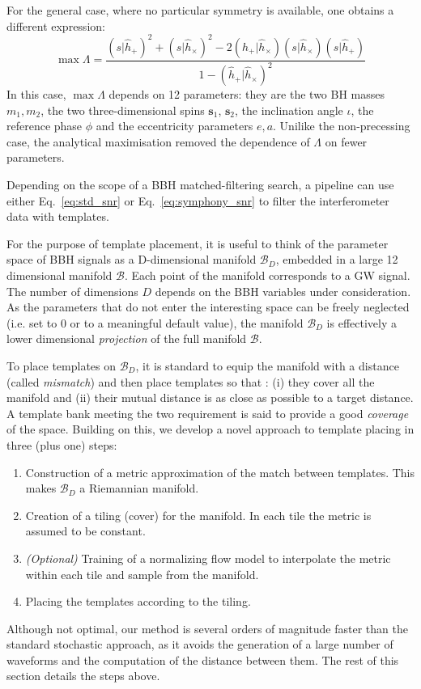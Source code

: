 \documentclass[twocolumn,showpacs,preprintnumbers,nofootinbib,prd,
superscriptaddress,10pt]{revtex4-2}
\newcommand{\rescalar}[2]{( #1 |#2 )}
\begin{document}
For the general case, where no particular symmetry is available, one obtains a different expression:
\begin{equation}\label{eq:symphony_snr}
	\max \Lambda = \frac{ \rescalar{s}{\hat{h}_+}^2 + \rescalar{s}{\hat{h}_\times}^2 -2\rescalar{\hat{h}_+}{\hat{h}_\times}\rescalar{s}{\hat{h}_\times}\rescalar{s}{\hat{h}_+}}{1- \rescalar{\hat{h}_+}{\hat{h}_\times}^2}
\end{equation}
In this case, $\max\Lambda$ depends on 12 parameters: they are the two BH masses $m_1, m_2$, the two three-dimensional spins $\mathbf{s}_1$, $\mathbf{s}_2$, the inclination angle $\iota$, the reference phase $\phi$ and the eccentricity parameters $e, a$.
Unilike the non-precessing case, the analytical maximisation removed the dependence of $\Lambda$ on fewer parameters.

Depending on the scope of a BBH matched-filtering search, a pipeline can use either Eq.~\eqref{eq:std_snr} or Eq.~\eqref{eq:symphony_snr} to filter the interferometer data with templates.

For the purpose of template placement, it is useful to think of the parameter space of BBH signals as a D-dimensional manifold $\mathcal{B}_D$, embedded in a large 12 dimensional manifold $\mathcal{B}$. Each point of the manifold corresponds to a GW signal. The number of dimensions $D$ depends on the BBH variables under consideration.
As the parameters that do not enter the interesting space can be freely neglected (i.e. set to $0$ or to a meaningful default value), the manifold $\mathcal{B}_D$ is effectively a lower dimensional {\it projection} of the full manifold $\mathcal{B}$.

To place templates on $\mathcal{B}_D$, it is standard to equip the manifold with a distance (called {\it mismatch}) and then place templates so that \cite{Allen:2021yuy}: (i) they cover all the manifold and (ii) their mutual distance is as close as possible to a target distance.
A template bank meeting the two requirement is said to provide a good {\it coverage} of the space.
Building on this, we develop a novel approach to template placing in three (plus one) steps:

\begin{enumerate}
	\item Construction of a metric approximation of the match between templates. This makes $\mathcal{B}_D$ a Riemannian manifold.
	\item Creation of a tiling (cover) for the manifold. In each tile the metric is assumed to be constant.
	\item \textit{(Optional)} Training of a normalizing flow model to interpolate the metric within each tile and sample from the manifold. 
	\item Placing the templates according to the tiling.
\end{enumerate}
Although not optimal, our method is several orders of magnitude faster than the standard stochastic approach, as it avoids the generation of a large number of waveforms and the computation of the distance between them.
The rest of this section details the steps above.
\end{document}
